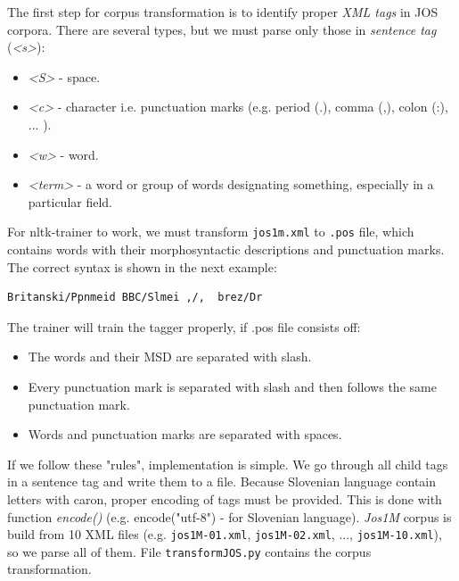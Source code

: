 \documentclass[10pt, conference, compsocconf]{IEEEtran}
\begin{document}
The first step for corpus transformation is to identify proper \textit{XML tags}\cite{xml_tags} in JOS corpora. There are several types, but we must parse only those in \textit{sentence tag }(\textit{<s>}):
\begin{itemize}
\item \textit{<S>} - space.
\item \textit{<c>} - character i.e. punctuation marks (e.g. period (.), comma (,), colon (:), ... ).
\item \textit{<w>} - word.
\item \textit{<term>} - a word or group of words designating something, especially in a particular field. 
\end{itemize}

For nltk-trainer to work, we must transform \texttt{jos1m.xml} to \texttt{.pos} file, which contains words with their morphosyntactic descriptions and punctuation marks. The correct syntax is shown in the next example:
\begin{lstlisting}
Britanski/Ppnmeid BBC/Slmei ,/,  brez/Dr 
\end{lstlisting}

The trainer will train the tagger properly, if .pos file consists off:
\begin{itemize}
\item The words and their MSD are separated with slash.
\item Every punctuation mark is separated with slash and then follows the same punctuation mark.
\item Words and punctuation marks are separated with spaces.
\end{itemize}

If we follow these "rules", implementation is simple. We go through all child tags in a sentence tag and write them to a file. Because Slovenian language contain letters with caron, proper encoding of tags must be provided. This is done with function \textit{encode()} (e.g. encode("utf-8") - for Slovenian language).
\textit{Jos1M} corpus is build from 10 XML files (e.g. \texttt{jos1M-01.xml},  \texttt{jos1M-02.xml}, ..., \texttt{jos1M-10.xml}), so we parse all of them. 
File \texttt{transformJOS.py} contains the corpus transformation.
\end{document}
